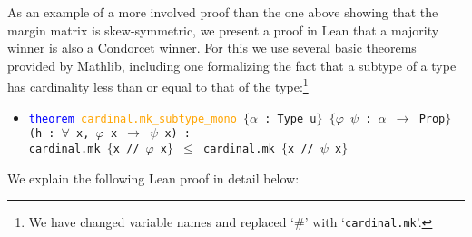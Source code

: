 \documentclass[runningheads]{llncs}
\begin{document}
As an example of a more involved proof than the one above showing that the margin matrix is skew-symmetric, we present a proof in Lean that a majority winner is also a Condorcet winner. For this we use several basic theorems provided by Mathlib, including one formalizing the fact that a subtype of a type has cardinality less than or equal to that of the type:\footnote{We have changed variable names and replaced `$\#$' with `\texttt{cardinal.mk}'.}
\begin{itemize}
\item[] \texttt{\textcolor{blue}{theorem} \textcolor{orange}{cardinal.mk\_subtype\_mono} $\{$$\alpha$ : Type u$\}$ $\{$$\varphi$ $\psi$ : $\alpha$ $\to$ Prop$\}$} \\
\texttt{(h : $\forall$ x, $\varphi$ x $\to$ $\psi$ x) :} \\
\texttt{cardinal.mk $\{$x // $\varphi$ x$\}$ $\leq$ cardinal.mk $\{$x // $\psi$ x$\}$}
\end{itemize}
We explain the following Lean proof in detail below:
\end{document}
